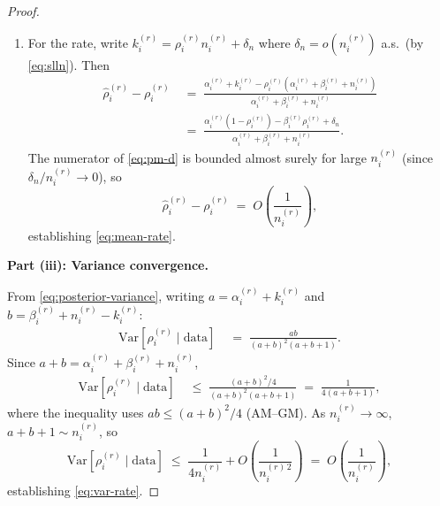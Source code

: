 \documentclass[12pt,openany]{book}
\numberwithin{equation}{chapter}
\theoremstyle{plain}
\theoremstyle{definition}
\theoremstyle{remark}
\numberwithin{equation}{chapter}
\theoremstyle{plain}
\begin{document}
\begin{proof}
\begin{enumerate}
  \item[\textup{(d)}] For the rate, write
        $k_i^{(r)} = \rho_i^{(r)} n_i^{(r)} + \delta_n$
        where $\delta_n = o(n_i^{(r)})$ a.s.\ (by \eqref{eq:slln}).
        Then
        \begin{align}
          \hat{\rho}_i^{(r)} - \rho_i^{(r)}
          &\;=\;
          \frac{
            \alpha_i^{(r)} + k_i^{(r)}
            - \rho_i^{(r)}(\alpha_i^{(r)}+\beta_i^{(r)}+n_i^{(r)})
          }{\alpha_i^{(r)} + \beta_i^{(r)} + n_i^{(r)}}
          \nonumber\\[4pt]
          &\;=\;
          \frac{
            \alpha_i^{(r)}(1-\rho_i^{(r)})
            - \beta_i^{(r)}\rho_i^{(r)}
            + \delta_n
          }{\alpha_i^{(r)} + \beta_i^{(r)} + n_i^{(r)}}.
          \label{eq:pm-d}
        \end{align}
        The numerator of \eqref{eq:pm-d} is bounded almost
        surely for large $n_i^{(r)}$ (since $\delta_n / n_i^{(r)}
        \to 0$), so
        \begin{equation}
          \hat{\rho}_i^{(r)} - \rho_i^{(r)}
          \;=\; O\!\left(\frac{1}{n_i^{(r)}}\right),
        \end{equation}
        establishing \eqref{eq:mean-rate}.
\end{enumerate}

\medskip
\noindent\textbf{Part (iii): Variance convergence.}

From \eqref{eq:posterior-variance}, writing
$a = \alpha_i^{(r)} + k_i^{(r)}$ and
$b = \beta_i^{(r)} + n_i^{(r)} - k_i^{(r)}$:
\begin{align}
  \mathrm{Var}\!\left[\rho_i^{(r)}\mid\mathrm{data}\right]
  &\;=\;
  \frac{ab}{(a+b)^2(a+b+1)}.
  \label{eq:var-proof-a}
\end{align}
Since $a + b = \alpha_i^{(r)} + \beta_i^{(r)} + n_i^{(r)}$,
\begin{align}
  \mathrm{Var}\!\left[\rho_i^{(r)}\mid\mathrm{data}\right]
  &\;\leq\;
  \frac{(a+b)^2/4}{(a+b)^2(a+b+1)}
  \;=\;
  \frac{1}{4(a+b+1)},
  \label{eq:var-proof-b}
\end{align}
where the inequality uses $ab \leq (a+b)^2/4$ (AM--GM).
As $n_i^{(r)} \to \infty$, $a + b + 1 \sim n_i^{(r)}$, so
\begin{equation}
  \mathrm{Var}\!\left[\rho_i^{(r)}\mid\mathrm{data}\right]
  \;\leq\;
  \frac{1}{4 n_i^{(r)}} + O\!\left(\frac{1}{n_i^{(r)\,2}}\right)
  \;=\; O\!\left(\frac{1}{n_i^{(r)}}\right),
\end{equation}
establishing \eqref{eq:var-rate}.


\end{proof}
\end{document}
